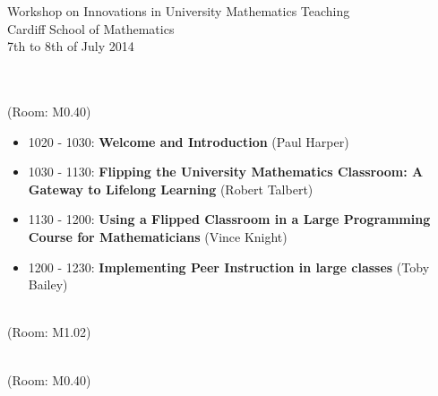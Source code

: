 \documentclass[a4paper]{article}
\begin{document}



\begin{center}
    {\Huge Workshop on Innovations in University Mathematics Teaching}\\
    {\tiny Cardiff School of Mathematics}\\
    {\tiny 7th to 8th of July 2014}\\
    \vspace{1cm}
    {}\\
\end{center}

\vspace{1cm}

\begin{center}
    \\
    \tiny{(Room: M0.40)}
\end{center}

\begin{itemize}
    \item 1020 - 1030: \textbf{Welcome and Introduction} (Paul Harper)
    \item 1030 - 1130: \textbf{Flipping the University Mathematics Classroom: A Gateway to Lifelong Learning} (Robert Talbert)
    \item 1130 - 1200: \textbf{Using a Flipped Classroom in a Large Programming Course for Mathematicians} (Vince Knight)
    \item 1200 - 1230: \textbf{Implementing Peer Instruction in large classes} (Toby Bailey)
\end{itemize}

\vspace{.5cm}

\begin{center}
    \\
    \tiny{(Room: M1.02)}
\end{center}

\vspace{.5cm}

\begin{center}
    \\
    \tiny{(Room: M0.40)}
\end{center}
\end{document}
